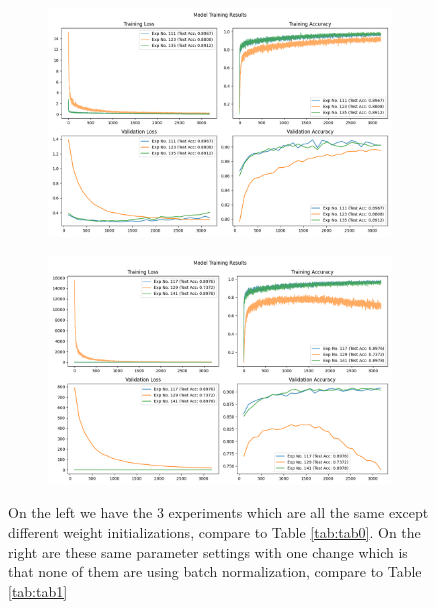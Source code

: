 \documentclass[10pt]{amsart}
\begin{document}
\begin{figure}[h]
    \centering
    \begin{subfigure}{0.49\textwidth}
        \centering
        \includegraphics[width=.9\textwidth]{../visualizations/model_training_results_vis_10.png}
        \label{fig:image1}
    \end{subfigure}
    \begin{subfigure}{0.49\textwidth}
        \centering
        \includegraphics[width=.9\textwidth]{../visualizations/model_training_results_vis_11.png}
        \label{fig:image2}
    \end{subfigure}
    \caption{On the left we have the 3 experiments which are all the same except different weight initializations, compare to Table \ref{tab:tab0}.
    On the right are these same parameter settings with one change which is that none of them are using batch normalization, compare to Table \ref{tab:tab1}}
    \label{fig:f0}
\end{figure}
\end{document}

